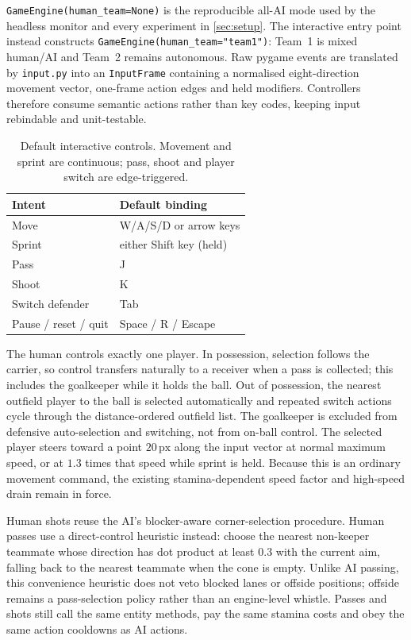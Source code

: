 \documentclass[10pt,twocolumn]{article}
\newcommand{\px}{\ensuremath{\,\mathrm{px}}}
\newcommand{\code}[1]{\texttt{#1}}
\begin{document}
\code{GameEngine(human\_team=None)} is the reproducible all-AI mode used by
the headless monitor and every experiment in \cref{sec:setup}. The interactive
entry point instead constructs \code{GameEngine(human\_team="team1")}: Team~1
is mixed human/AI and Team~2 remains autonomous. Raw pygame events are
translated by \code{input.py} into an \code{InputFrame} containing a
normalised eight-direction movement vector, one-frame action edges and held
modifiers. Controllers therefore consume semantic actions rather than key
codes, keeping input rebindable and unit-testable.

\begin{table}[t]
\centering\small
\caption{Default interactive controls. Movement and sprint are continuous;
pass, shoot and player switch are edge-triggered.}
\label{tab:controls}
\begin{tabular}{@{}ll@{}}
\toprule
Intent & Default binding \\
\midrule
Move & W/A/S/D or arrow keys \\
Sprint & either Shift key (held) \\
Pass & J \\
Shoot & K \\
Switch defender & Tab \\
Pause / reset / quit & Space / R / Escape \\
\bottomrule
\end{tabular}
\end{table}

The human controls exactly one player. In possession, selection follows the
carrier, so control transfers naturally to a receiver when a pass is
collected; this includes the goalkeeper while it holds the ball. Out of
possession, the nearest outfield player to the ball is selected automatically
and repeated switch actions cycle through the distance-ordered outfield list.
The goalkeeper is excluded from defensive auto-selection and switching, not
from on-ball control.
The selected player steers toward a point $20\px$ along the input vector at
normal maximum speed, or at $1.3$ times that speed while sprint is held.
Because this is an ordinary movement command, the existing stamina-dependent
speed factor and high-speed drain remain in force.

Human shots reuse the AI's blocker-aware corner-selection procedure. Human
passes use a direct-control heuristic instead: choose the nearest non-keeper
teammate whose direction has dot product at least $0.3$ with the current aim,
falling back to the nearest teammate when the cone is empty. Unlike AI
passing, this convenience heuristic does not veto blocked lanes or offside
positions; offside remains a pass-selection policy rather than an
engine-level whistle. Passes and shots still call the same entity methods,
pay the same stamina costs and obey the same action cooldowns as AI actions.
\end{document}
